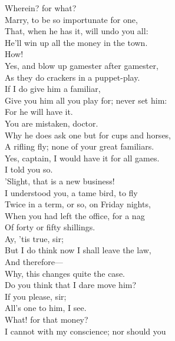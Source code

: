 \documentclass[a4paper,oneside]{memoir}
\begin{document}
\begin{drama*}
\facespeaks {} Wherein? for what?\\
\subtlespeaks Marry, to be so importunate for one,\\
That, when he has it, will undo you all:\\
He'll win up all the money in the town.\\
\facespeaks How!\\
\subtlespeaks {} Yes, and blow up gamester after gamester,\\
As they do crackers in a puppet-play.\\
If I do give him a familiar,\\
Give you him all you play for; never set him:\\
For he will have it.\\
\facespeaks {} You are mistaken, doctor.\\
Why he does ask one but for cups and horses,\\
A rifling fly; none of your great familiars.\\
\dapperspeaks Yes, captain, I would have it for all games.\\
\subtlespeaks I told you so.\\
\facespeaks {}  'Slight, that is a new business!\\
I understood you, a tame bird, to fly\\
Twice in a term, or so, on Friday nights,\\
When you had left the office, for a nag\\
Of forty or fifty shillings.\\
\dapperspeaks {} Ay, 'tis true, sir;\\
But I do think now I shall leave the law,\\
And therefore---\\
\facespeaks {} Why, this changes quite the case.\\
Do you think that I dare move him?\\
\dapperspeaks {} If you please, sir;\\
All's one to him, I see.\\
\facespeaks {} What! for that money?\\
I cannot with my conscience; nor should you\\

\end{drama*}
\end{document}
